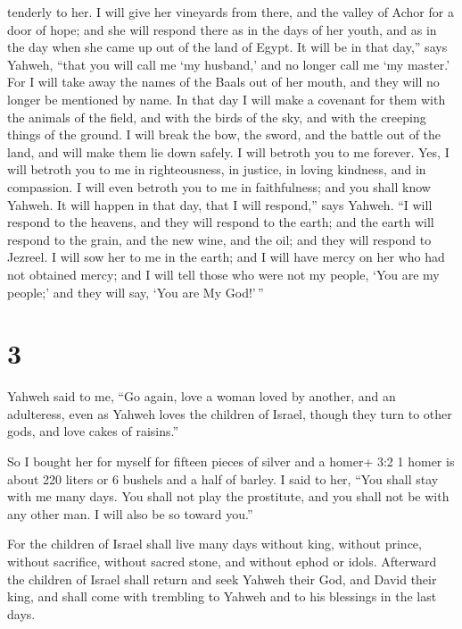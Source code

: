 tenderly to her.  I will give her vineyards from there, and
the valley of Achor for a door of hope; and she will respond there as in
the days of her youth, and as in the day when she came up out of the
land of Egypt.  It will be in that day,'' says Yahweh,
``that you will call me `my husband,' and no longer call me `my master.'
 For I will take away the names of the Baals out of her
mouth, and they will no longer be mentioned by name.  In
that day I will make a covenant for them with the animals of the field,
and with the birds of the sky, and with the creeping things of the
ground. I will break the bow, the sword, and the battle out of the land,
and will make them lie down safely.  I will betroth you to
me forever. Yes, I will betroth you to me in righteousness, in justice,
in loving kindness, and in compassion.  I will even betroth
you to me in faithfulness; and you shall know Yahweh.  It
will happen in that day, that I will respond,'' says Yahweh. ``I will
respond to the heavens, and they will respond to the earth;
 and the earth will respond to the grain, and the new wine,
and the oil; and they will respond to Jezreel.  I will sow
her to me in the earth; and I will have mercy on her who had not
obtained mercy; and I will tell those who were not my people, `You are
my people;' and they will say, `You are My God!'\,''

\hypertarget{section-2}{%
\section{3}\label{section-2}}

 Yahweh said to me, ``Go again, love a woman loved by
another, and an adulteress, even as Yahweh loves the children of Israel,
though they turn to other gods, and love cakes of raisins.''

 So I bought her for myself for fifteen pieces of silver and
a homer+ 3:2 1 homer is about 220 liters or 6 bushels and a half of
barley.  I said to her, ``You shall stay with me many days.
You shall not play the prostitute, and you shall not be with any other
man. I will also be so toward you.''

 For the children of Israel shall live many days without
king, without prince, without sacrifice, without sacred stone, and
without ephod or idols.  Afterward the children of Israel
shall return and seek Yahweh their God, and David their king, and shall
come with trembling to Yahweh and to his blessings in the last days.

